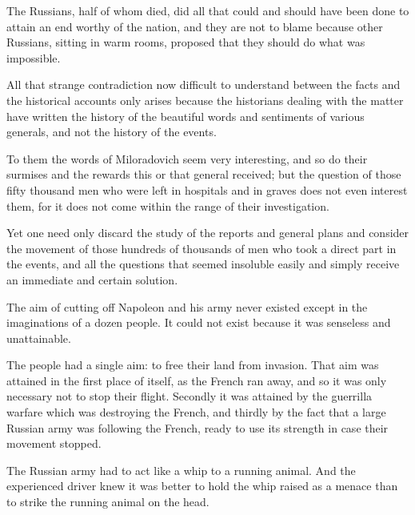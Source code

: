 The Russians, half of whom died, did all that could and should
have been done to attain an end worthy of the nation, and they
are not to blame because other Russians, sitting in warm rooms,
proposed that they should do what was impossible.

All that strange contradiction now difficult to understand
between the facts and the historical accounts only arises because
the historians dealing with the matter have written the history
of the beautiful words and sentiments of various generals, and
not the history of the events.

To them the words of Miloradovich seem very interesting, and so
do their surmises and the rewards this or that general received;
but the question of those fifty thousand men who were left in
hospitals and in graves does not even interest them, for it does
not come within the range of their investigation.

Yet one need only discard the study of the reports and general
plans and consider the movement of those hundreds of thousands of
men who took a direct part in the events, and all the questions
that seemed insoluble easily and simply receive an immediate and
certain solution.

The aim of cutting off Napoleon and his army never existed except
in the imaginations of a dozen people. It could not exist because
it was senseless and unattainable.

The people had a single aim: to free their land from
invasion. That aim was attained in the first place of itself, as
the French ran away, and so it was only necessary not to stop
their flight. Secondly it was attained by the guerrilla warfare
which was destroying the French, and thirdly by the fact that a
large Russian army was following the French, ready to use its
strength in case their movement stopped.

The Russian army had to act like a whip to a running animal. And
the experienced driver knew it was better to hold the whip raised
as a menace than to strike the running animal on the head.

